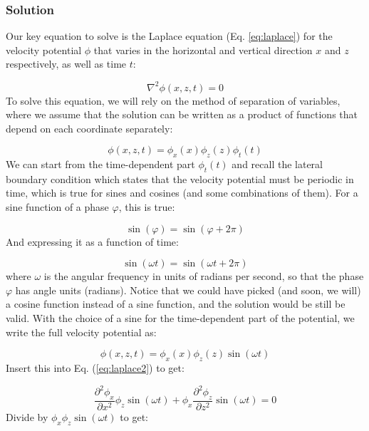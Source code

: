 \documentclass[12pt]{article}
\numberwithin{equation}{section}
\numberwithin{figure}{section}
\numberwithin{table}{section}
\begin{document}
\subsubsection{Solution}

Our key equation to solve is the Laplace equation (Eq. \ref{eq:laplace})
for the velocity potential $\phi$ that varies in the horizontal and vertical
direction $x$ and $z$ respectively, as well as time $t$:

\begin{equation}
  \nabla^2 \phi(x, z, t) = 0
  \label{eq:laplace2}
\end{equation}
To solve this equation, we will rely on the method of separation of variables,
where we assume that the solution can be written as a product of functions that
depend on each coordinate separately:

\begin{equation}
  \phi(x, z, t) = \phi_x(x) \phi_z(z) \phi_t(t)
\end{equation}
We can start from the time-dependent part $\phi_t(t)$ and recall the lateral
boundary condition which states that the velocity potential must be periodic
in time, which is true for sines and cosines (and some combinations of them).
For a sine function of a phase $\varphi$, this is true:

\begin{equation}
  \sin(\varphi) = \sin(\varphi + 2\pi)
\end{equation}
And expressing it as a function of time:

\begin{equation}
  \sin(\omega t) = \sin(\omega t + 2\pi)
\end{equation}
where $\omega$ is the angular frequency in units of radians per second, so that
the phase $\varphi$ has angle units (radians).
Notice that we could have picked (and soon, we will) a cosine function instead of
a sine function, and the solution would be still be valid.
With the choice of a sine for the time-dependent part of the potential, we write
the full velocity potential as:

\begin{equation}
  \phi(x, z, t) = \phi_x(x) \phi_z(z) \sin(\omega t)
  \label{eq:phi1}
\end{equation}
Insert this into Eq. (\ref{eq:laplace2}) to get:

\begin{equation}
  \frac{\partial^2 \phi_x}{\partial x^2} \phi_z \sin(\omega t) +
  \phi_x \frac{\partial^2 \phi_z}{\partial z^2} \sin(\omega t) = 0
\end{equation}
Divide by $\phi_x \phi_z \sin(\omega t)$ to get:
\end{document}
